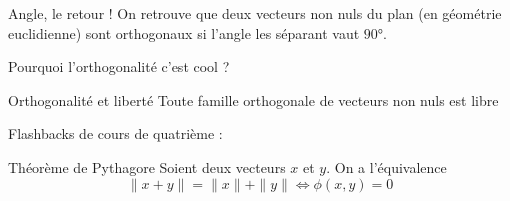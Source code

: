 \documentclass{classe}
\begin{document}
\begin{remarque}{Angle, le retour !}{}
	On retrouve que deux vecteurs non nuls du plan (en géométrie euclidienne) sont orthogonaux si l'angle les séparant vaut $90$°.
\end{remarque}

Pourquoi l'orthogonalité c'est cool ?

\begin{théorème}{Orthogonalité et liberté}{}
Toute famille orthogonale de vecteurs non nuls est libre
\end{théorème}


Flashbacks de cours de quatrième :

\begin{théorème}{Théorème de Pythagore}{}
Soient deux vecteurs $x$ et $y$. On a l'équivalence 
\begin{equation*}
\| x+y \| = \|x\| + \|y\| \iff \phi(x, y) = 0
\end{equation*}
\end{théorème}
\end{document}
